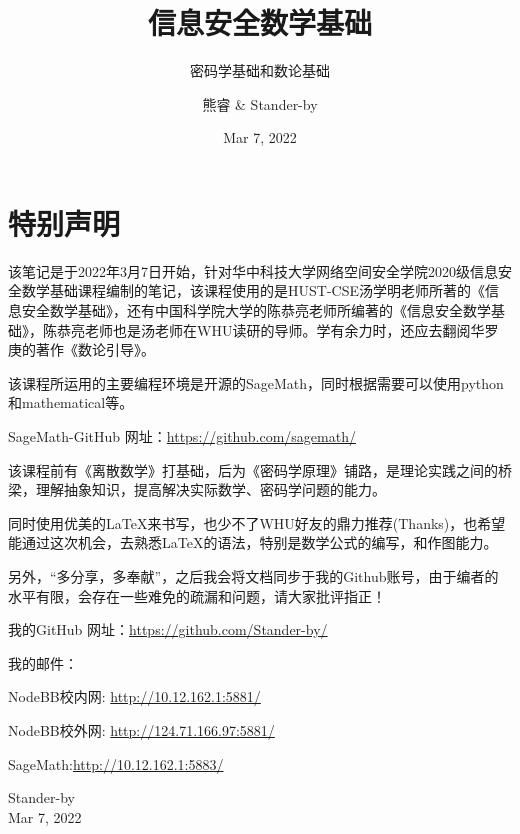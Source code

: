 \documentclass[cn,10pt]{elegantbook}
\title{信息安全数学基础}
\subtitle{密码学基础和数论基础}
\author{熊睿 \& Stander-by}
\institute{HUST-CSE-2004}
\date{Mar 7, 2022}
\begin{document}
\maketitle
\frontmatter

\chapter*{特别声明}


该笔记是于2022年3月7日开始，针对华中科技大学网络空间安全学院2020级信息安全数学基础课程编制的笔记，该课程使用的是HUST-CSE汤学明老师所著的《信息安全数学基础》，还有中国科学院大学的陈恭亮老师所编著的《信息安全数学基础》，陈恭亮老师也是汤老师在WHU读研的导师。学有余力时，还应去翻阅华罗庚的著作《数论引导》。

该课程所运用的主要编程环境是开源的SageMath，同时根据需要可以使用python和mathematical等。

SageMath-GitHub 网址：\href{https://github.com/sagemath/}{https://github.com/sagemath/}

该课程前有《离散数学》打基础，后为《密码学原理》铺路，是理论实践之间的桥梁，理解抽象知识，提高解决实际数学、密码学问题的能力。

同时使用优美的\LaTeX{}来书写，也少不了WHU好友的鼎力推荐(Thanks)，也希望能通过这次机会，去熟悉\LaTeX{}的语法，特别是数学公式的编写，和作图能力。

\vskip 0.5cm

另外，“多分享，多奉献”，之后我会将文档同步于我的Github账号，由于编者的水平有限，会存在一些难免的疏漏和问题，请大家批评指正！

\vskip 0.5cm

我的GitHub 网址：\href{https://github.com/Stander-by/}{https://github.com/Stander-by/}

我的邮件：

NodeBB校内网: \href{http://10.12.162.1:5881/}{http://10.12.162.1:5881/}

NodeBB校外网: \href{http://124.71.166.97:5881/}{http://124.71.166.97:5881/}

SageMath:\href{http://10.12.162.1:5883/}{http://10.12.162.1:5883/}
\vskip 1.5cm

\begin{flushright}
Stander-by\\
Mar 7, 2022
\end{flushright}

\tableofcontents

\mainmatter
\end{document}
